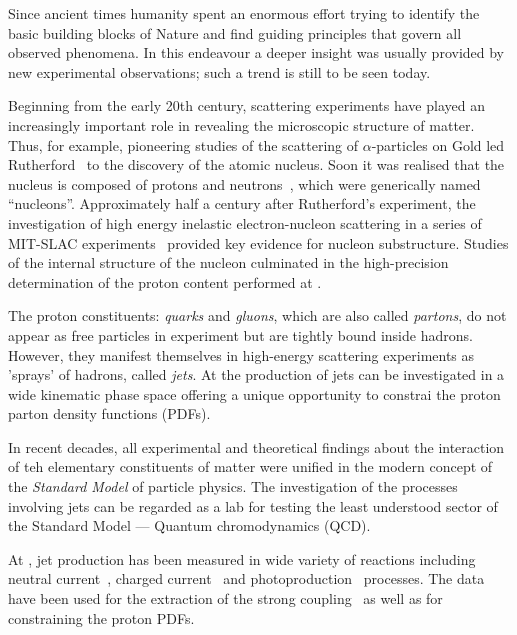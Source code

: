 Since ancient times humanity spent an enormous effort trying to identify the basic building blocks of Nature and find guiding principles that govern all observed phenomena. In this endeavour a deeper insight was usually provided by new experimental observations; such a trend is still to be seen today.

Beginning from the early 20th century, scattering experiments have played an increasingly important role in revealing the microscopic structure of matter. Thus, for example, pioneering studies of the scattering of $\alpha$-particles on Gold led Rutherford~\cite{rutherford} to the discovery of the atomic nucleus. Soon it was realised that the nucleus is composed of protons and neutrons~\cite{Chadwick}, which were generically named ``nucleons''. Approximately half a century after Rutherford's experiment, the investigation of high energy inelastic electron-nucleon scattering in a series of MIT-SLAC experiments~\cite{slac} provided key evidence for nucleon substructure. Studies of the internal structure of the nucleon culminated in the high-precision determination of the proton content performed at \hera.

The proton constituents: \emph{quarks} and \emph{gluons}, which are also called \emph{partons}, do not appear as free particles in experiment but are tightly bound inside hadrons. However, they manifest themselves in high-energy scattering experiments as 'sprays' of hadrons, called \emph{jets}. At \hera the production of jets can be investigated in a wide kinematic phase space offering a unique opportunity to constrai the proton parton density functions (PDFs).

In recent decades, all experimental and theoretical findings about the interaction of teh elementary constituents of matter were unified in the modern concept of the \emph{Standard Model} of particle physics. The investigation of the processes involving jets can be regarded as a lab for testing the least understood sector of the Standard Model --- Quantum chromodynamics (QCD).

At \hera, jet production has been measured in wide variety of reactions including neutral current~\cite{ncjets}, charged current~\cite{ccjets} and photoproduction~\cite{phpjets} processes. The data have been used for the extraction of the strong coupling~\cite{jets} as well as for constraining the proton PDFs.

